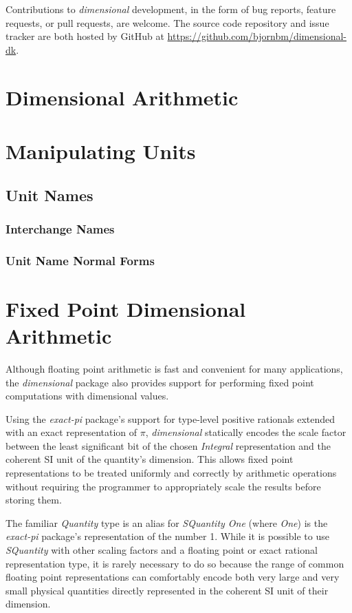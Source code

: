 \documentclass[12pt]{report}
\newcommand{\packagename}[1]{\textit{#1}}
\newcommand{\thispackage}{\packagename{dimensional}}
\newcommand{\classname}[1]{\textit{#1}}
\newcommand{\typename}[1]{\textit{#1}}
\begin{document}
Contributions to \thispackage{} development, in the form of bug reports,
feature requests, or pull requests, are welcome. The source code repository and issue
tracker are both hosted by GitHub at \url{https://github.com/bjornbm/dimensional-dk}.

\chapter{Dimensional Arithmetic}

\chapter{Manipulating Units}

\section{Unit Names}

\subsection{Interchange Names}
\subsection{Unit Name Normal Forms}

\chapter{Fixed Point Dimensional Arithmetic}

Although floating point arithmetic is fast and convenient for many applications, the \thispackage{} package also provides
support for performing fixed point computations with dimensional values.

Using the \packagename{exact-pi} package's support for type-level positive rationals extended with an exact representation
of $ \pi $, \thispackage{} statically encodes the scale factor between the least significant bit of the chosen \classname{Integral}
representation and the coherent SI unit of the quantity's dimension. This allows fixed point representations to be
treated uniformly and correctly by arithmetic operations without requiring the programmer to appropriately scale the results
before storing them.

The familiar \typename{Quantity} type is an alias for \typename{SQuantity One} (where \typename{One}) is the \packagename{exact-pi}
package's representation of the number 1. While it is possible to use \typename{SQuantity} with other scaling factors and a
floating point or exact rational representation type, it is rarely necessary to do so because the range of common floating
point representations can comfortably encode both very large and very small physical quantities directly represented in the
coherent SI unit of their dimension.
\end{document}
